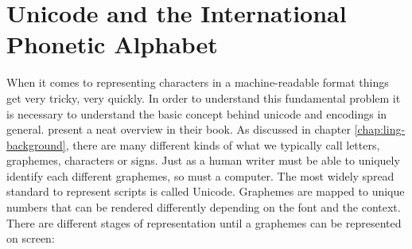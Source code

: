 \section{Unicode and the International Phonetic Alphabet}
\label{sec:unicode_ipa}
When it comes to representing characters in a machine-readable format things get very tricky, very quickly. In order to understand this fundamental problem it is necessary to understand the basic concept behind unicode and encodings in general. \citet{unicode-lingu} present a neat overview in their book. As discussed in chapter \ref{chap:ling-background}, there are many different kinds of what we typically call letters, graphemes, characters or signs. Just as a human writer must be able to uniquely identify each different graphemes, so must a computer. The most widely spread standard to represent scripts is called Unicode. Graphemes are mapped to unique numbers that can be rendered differently depending on the font and the context. There are different stages of representation until a graphemes can be represented on screen:

